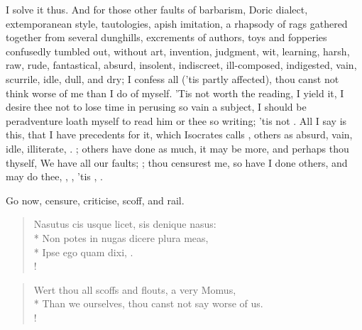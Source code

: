 {I solve it thus. And for those other faults of barbarism, Doric
dialect, extemporanean style, tautologies, apish imitation, a rhapsody
of rags gathered together from several dunghills, excrements of
authors, toys and fopperies confusedly tumbled out, without art,
invention, judgment, wit, learning, harsh, raw, rude, fantastical,
absurd, insolent, indiscreet, ill-composed, indigested, vain, scurrile,
idle, dull, and dry; I confess all ('tis partly affected), thou canst
not think worse of me than I do of myself. 'Tis not worth the reading,
I yield it, I desire thee not to lose time in perusing so vain a
subject, I should be peradventure loath myself to read him or thee so
writing; 'tis not . All I say is this, that I have
precedents for it, which Isocrates calls , others as absurd, vain, idle, illiterate, \etc. ; others have done as much, it may be more, and perhaps
thou thyself,  We have all our faults; ; thou censurest me, so have I done others, and
may do thee, , \etc, 'tis , .

Go now, censure, criticise, scoff, and rail.

\begin{latin}
\begin{verse}%
Nasutus cis usque licet, sis denique nasus:\\*
Non potes in nugas dicere plura meas,\\*
Ipse ego quam dixi, \etc.\\!
\end{verse}%
\end{latin}
\translationrule%
\begin{verse}%
Wert thou all scoffs and flouts, a very Momus,\\*
Than we ourselves, thou canst not say worse of us.\\!
\end{verse}%
%

}
